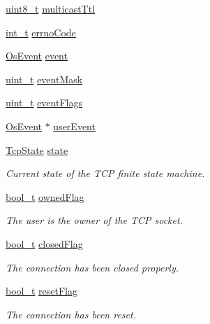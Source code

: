\begin{DoxyCompactItemize}
\item 
\hyperlink{stdint_8h_aba7bc1797add20fe3efdf37ced1182c5}{uint8\+\_\+t} \hyperlink{struct__Socket_a69fe8dadf3142b75339e8f484b9059c0}{multicast\+Ttl}
\item 
\hyperlink{compiler__port_8h_a022c65af7f6c8d3947e8a37d64db6ad6}{int\+\_\+t} \hyperlink{struct__Socket_aee3167da0ccb8f0f3da2d338a4a64647}{errno\+Code}
\item 
\hyperlink{structOsEvent}{Os\+Event} \hyperlink{struct__Socket_a4405b0252467b2cd50e19867f1ffa021}{event}
\item 
\hyperlink{compiler__port_8h_a12a1e9b3ce141648783a82445d02b58d}{uint\+\_\+t} \hyperlink{struct__Socket_a81fc2ec7a7afdb0afd7bf1519ec5f89f}{event\+Mask}
\item 
\hyperlink{compiler__port_8h_a12a1e9b3ce141648783a82445d02b58d}{uint\+\_\+t} \hyperlink{struct__Socket_ac7d6b7677f09b832f12acccf44574b00}{event\+Flags}
\item 
\hyperlink{structOsEvent}{Os\+Event} $\ast$ \hyperlink{struct__Socket_a732611247771fe0f744bb68e14cf9840}{user\+Event}
\item 
\hyperlink{tcp_8h_a4310b47e70de394d33f7cf601e35bfec}{Tcp\+State} \hyperlink{struct__Socket_a8985a20d225bf416709ce904e956ca46}{state}
\begin{DoxyCompactList}\small\item\em Current state of the T\+CP finite state machine. \end{DoxyCompactList}\item 
\hyperlink{compiler__port_8h_a812d16e5494522586b3784e55d479912}{bool\+\_\+t} \hyperlink{struct__Socket_a71faf3a071a85744df37461200a1de95}{owned\+Flag}
\begin{DoxyCompactList}\small\item\em The user is the owner of the T\+CP socket. \end{DoxyCompactList}\item 
\hyperlink{compiler__port_8h_a812d16e5494522586b3784e55d479912}{bool\+\_\+t} \hyperlink{struct__Socket_a01b5dbbf4c0b0b771f42e6fed879b0e9}{closed\+Flag}
\begin{DoxyCompactList}\small\item\em The connection has been closed properly. \end{DoxyCompactList}\item 
\hyperlink{compiler__port_8h_a812d16e5494522586b3784e55d479912}{bool\+\_\+t} \hyperlink{struct__Socket_a9efc804ce7a796e1974e7c28b7c704a7}{reset\+Flag}
\begin{DoxyCompactList}\small\item\em The connection has been reset. \end{DoxyCompactList}\item 

\end{DoxyCompactItemize}
